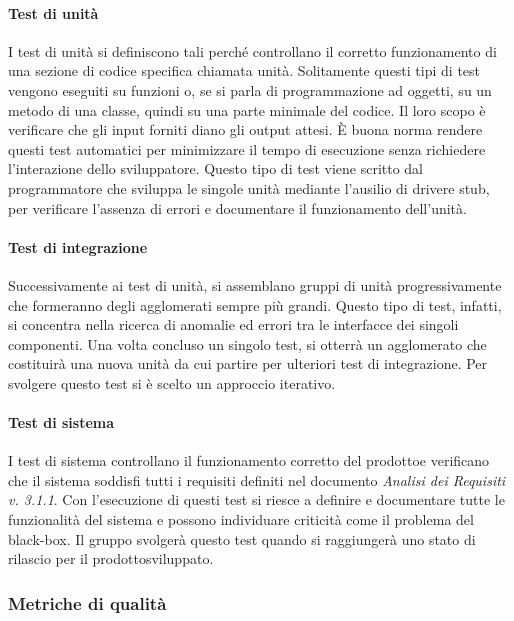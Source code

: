 \paragraph*{Test di unità} %
I test di unità si definiscono tali perché controllano il corretto funzionamento di una sezione di codice specifica chiamata unità. Solitamente questi tipi di test vengono eseguiti su funzioni o, se si parla di programmazione ad oggetti, su un metodo di una classe, quindi su una parte minimale del codice. Il loro scopo è verificare che gli input forniti diano gli output attesi. È buona norma rendere questi test automatici per minimizzare il tempo di esecuzione senza richiedere l'interazione dello sviluppatore. Questo tipo di test viene scritto dal programmatore che sviluppa le singole unità mediante l'ausilio di driver\glosp e stub\glo, per verificare l'assenza di errori e documentare il funzionamento dell'unità.

\paragraph*{Test di integrazione} %
Successivamente ai test di unità, si assemblano gruppi di unità progressivamente che formeranno degli agglomerati sempre più grandi. Questo tipo di test, infatti, si concentra nella ricerca di anomalie ed errori tra le interfacce dei singoli componenti. Una volta concluso un singolo test, si otterrà un agglomerato che costituirà una nuova unità da cui partire per ulteriori test di integrazione. Per svolgere questo test si è scelto un approccio iterativo.

\paragraph*{Test di sistema} %
I test di sistema controllano il funzionamento corretto del prodotto\glosp e verificano che il sistema soddisfi tutti i requisiti definiti nel documento \textit{Analisi dei Requisiti v. 3.1.1}. Con l'esecuzione di questi test si riesce a definire e documentare tutte le funzionalità del sistema e possono individuare criticità come il problema del black-box\glo. Il gruppo svolgerà questo test quando si raggiungerà uno stato di rilascio per il prodotto\glosp sviluppato.

\subsubsection{Metriche di qualità}
